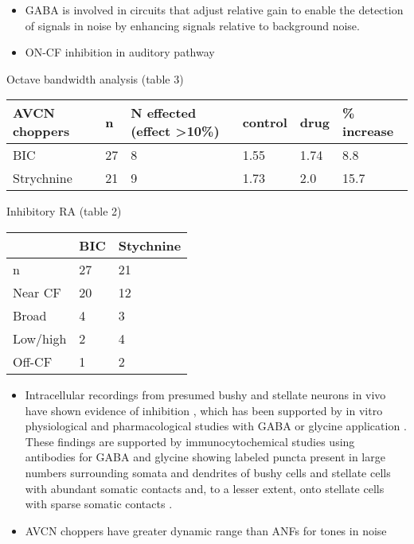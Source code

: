 \documentclass[10pt,a4paper]{article}
\begin{document}
\begin{itemize}
\item GABA is involved in circuits that adjust relative gain to enable the
  detection of signals in noise by enhancing signals relative to background
  noise.
\item ON-CF inhibition in auditory pathway
  \citep{CasparyPalombi:1993,CasparyPalombiEtAl:1993,EvansZhao:1993,PalombiCaspary:1992}
\end{itemize}

Octave bandwidth analysis (table 3)
\begin{flushleft}
  \tablehead{}
  \begin{tabularx}{\textwidth}{XXXXXX}
    \hline 
AVCN choppers & n & N effected (effect {\textgreater}10\%) & control    & drug & \% increase\\\hline 
BIC & 27 & 8 & 1.55 & 1.74 & 8.8\\\hline
    Strychnine & 21 & 9 & 1.73 & 2.0 & 15.7\\\hline
  \end{tabularx}
\end{flushleft}

Inhibitory RA (table 2)

\begin{flushleft}
  \tablehead{}
  \begin{tabularx}{\textwidth}{XXX}
    \toprule
& BIC & Stychnine \\\midrule 
n & 27 & 21\\        
Near CF & 20 & 12\\ 
Broad & 4 & 3\\     
Low/high & 2 & 4\\  
Off-CF & 1 &    2\\ 
\bottomrule
  \end{tabularx}
\end{flushleft}

\begin{itemize}
\item Intracellular recordings from presumed bushy and stellate neurons in vivo
  have shown evidence of inhibition \citep{RhodeSmith:1986,SmithRhode:1989},
  which has been supported by in vitro physiological and pharmacological studies
  with GABA or glycine application \citep{WuOertel:1986} . These findings are
  supported by immunocytochemical studies using antibodies for GABA and glycine
  showing labeled puncta present in large numbers surrounding somata and
  dendrites of bushy cells and stellate cells with abundant somatic contacts
  and, to a lesser extent, onto stellate cells with sparse somatic contacts
  \citep{AltschulerBetzEtAl:,SaintOstapoffEtAl:1993,SaintBensonEtAl:1991,SaintMorestEtAl:1989,WentholdHuieEtAl:1987,FexAltschulerEtAl:1986,WentholdZempelEtAl:1986,1986}.
\item AVCN choppers have greater dynamic range than ANFs for tones in noise
  \citep{MaySachs:1998,MaySachs:1992,PalmerEvans:1982,GeislerSilkes:1991,RhodeGeislerEtAl:1978,RhodeSmith:1986,YoungCostalupesEtAl:1983,YoungShofnerEtAl:1988,YoungRobertEtAl:1988}
\end{itemize}
\end{document}
